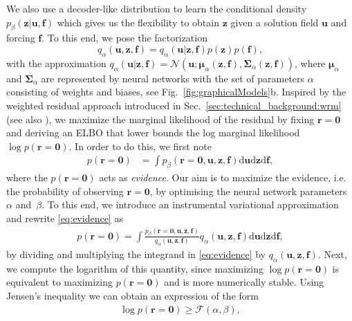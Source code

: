 \documentclass[11pt, fleqn]{article}
\def\cF{{\mathcal F}}
\def\z{{\mathbf z}}
\def\fbf{{\mathbf f}}
\def\ubf{{\mathbf u}}
\def\r{{\mathbf r}}
\def\cF{{\mathcal F}}
\def\NPDF{{\mathcal N}}
\def\md{{\mathrm d}}
\def \bmu {{\boldsymbol \mu}}
\def \bSigma {{\mathbf \Sigma}}
\begin{document}
We also use a decoder-like distribution to learn the conditional density $p_\beta(\z | \ubf, \fbf)$ which gives us the flexibility to obtain $\z$ given a solution field $\ubf$ and forcing $\fbf$. To this end, we pose the factorization 
%
\begin{equation} \label{eq:joint_variational_app_dataless}
    q_\alpha (\ubf, \z, \fbf) = q_\alpha (\ubf | \z, \fbf) p(\z) p (\fbf), 
\end{equation}
%
with the approximation $q_\alpha(\ubf | \z, \fbf) = \NPDF(\ubf; \bmu_\alpha(\z,\fbf), \bSigma_\alpha(\z,\fbf))$, where $\bmu_\alpha$ and $\bSigma_\alpha$ are represented by neural networks with the set of parameters $\alpha$ consisting of weights and biases, see Fig.~\ref{fig:graphicalModels}b. Inspired by the weighted residual approach introduced in Sec.~\ref{sec:technical_background:wrm} (see also \cite{rixner2021probabilistic}), we maximize the marginal likelihood of the residual by fixing $\r = \mathbf{0}$ and deriving an \gls*{ELBO} that lower bounds the log marginal likelihood $\log p(\r = \mathbf{0})$. 
 In order to do this, we first note
\begin{align}\label{eq:evidence}
    p(\r = \mathbf{0}) &= \int p_\beta(\r = \mathbf{0}, \ubf, \z, \fbf) \md \ubf \md \z \md \fbf,
\end{align}
where the $p(\r = \mathbf{0})$ acts as \textit{evidence}. Our aim is to maximize the  evidence, i.e. the probability of observing \mbox{$\r = \mathbf{0}$}, by optimising the neural network parameters~$\alpha$ and~$\beta$. To this end, we introduce an instrumental variational approximation and rewrite \eqref{eq:evidence} as
\begin{align}
    p(\r = \mathbf{0}) = \int \frac{p_\beta(\r = \mathbf{0}, \ubf, \z, \fbf)}{q_\alpha(\ubf,\z,\fbf)} q_\alpha(\ubf, \z, \fbf) \md \ubf \md \z \md \fbf,
\end{align}
by dividing and multiplying the integrand in \eqref{eq:evidence} by $q_\alpha(\ubf, \z, \fbf)$. Next, we compute the logarithm of this quantity, since maximizing $\log p(\r = \mathbf{0})$ is equivalent to maximizing $p(\r = \mathbf{0})$ and is more numerically stable. Using Jensen's inequality we can obtain an expression of the form 
\begin{align}
    \log p(\r=\mathbf{0})\geq \cF(\alpha, \beta),
\end{align}
\end{document}
